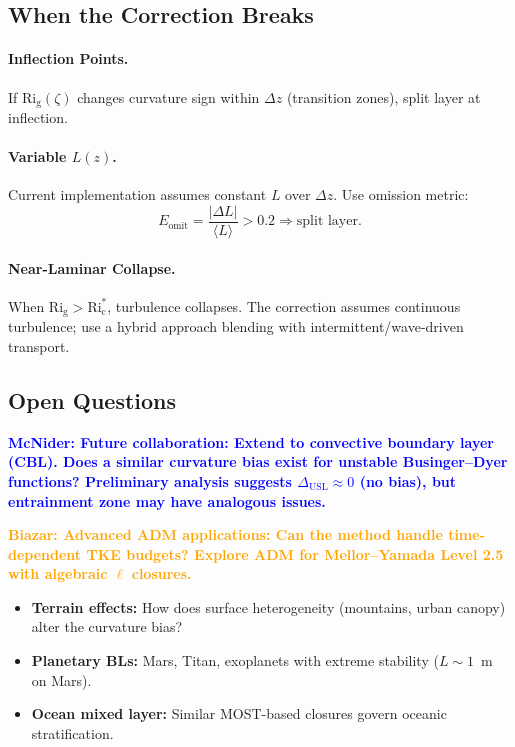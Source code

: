 \documentclass[twocolumn,11pt]{article}
\newcommand{\Rig}{\text{Ri}_{\text{g}}}
\newcommand{\Ric}{\text{Ri}_{\text{c}}}
\newcommand{\MCNIDER}[1]{\textcolor{blue}{\textbf{McNider: #1}}}
\newcommand{\BIAZAR}[1]{\textcolor{orange}{\textbf{Biazar: #1}}}
\begin{document}
\subsection{When the Correction Breaks}

\paragraph{Inflection Points.} If $\Rig(\zeta)$ changes curvature sign within $\Delta z$ (transition zones), split layer at inflection.

\paragraph{Variable $L(z)$.} Current implementation assumes constant $L$ over $\Delta z$. Use omission metric:
\begin{equation}
E_{\text{omit}} = \frac{|\Delta L|}{\langle L \rangle} > 0.2 \Rightarrow \text{split layer}.
\end{equation}

\paragraph{Near-Laminar Collapse.} When $\Rig > \Ric^*$, turbulence collapses. The correction assumes continuous turbulence; use a hybrid approach blending with intermittent/wave-driven transport.

\subsection{Open Questions}

\MCNIDER{Future collaboration: Extend to convective boundary layer (CBL). Does a similar curvature bias exist for unstable Businger--Dyer functions? Preliminary analysis suggests $\Delta_{\text{USL}} \approx 0$ (no bias), but entrainment zone may have analogous issues.}

\BIAZAR{Advanced ADM applications: Can the method handle time-dependent TKE budgets? Explore ADM for Mellor--Yamada Level 2.5 with algebraic $\ell$ closures.}

\begin{itemize}
\item \textbf{Terrain effects:} How does surface heterogeneity (mountains, urban canopy) alter the curvature bias?
\item \textbf{Planetary BLs:} Mars, Titan, exoplanets with extreme stability ($L \sim 1$~m on Mars).
\item \textbf{Ocean mixed layer:} Similar MOST-based closures govern oceanic stratification.
\end{itemize}
\end{document}

